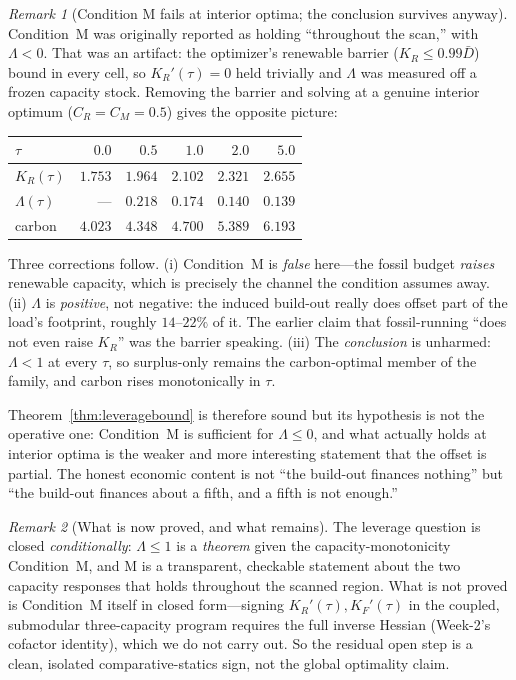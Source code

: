 \documentclass[11pt,reqno]{amsart}
\theoremstyle{plain}
\theoremstyle{definition}
\theoremstyle{remark}
\newtheorem{remark}{Remark}
\theoremstyle{remark}\newtheorem{observation}{Observation}
\newcommand{\KR}{K_R}\newcommand{\KF}{K_F}\newcommand{\KM}{K_M}
\newcommand{\Dbar}{\bar D}\newcommand{\CM}{C_M}\newcommand{\CF}{C_F}\newcommand{\CR}{C_R}
\begin{document}
\begin{remark}[Condition M fails at interior optima; the conclusion survives anyway]
\label{rem:condMfails}
Condition~M was originally reported as holding ``throughout the scan,'' with $\Lambda<0$.
That was an artifact: the optimizer's renewable barrier ($\KR\le0.99\Dbar$) bound in every
cell, so $\KR'(\tau)=0$ held trivially and $\Lambda$ was measured off a frozen capacity
stock. Removing the barrier and solving at a genuine interior optimum ($\CR=\CM=0.5$)
gives the opposite picture:
\begin{center}\small
\begin{tabular}{lrrrrr}
\toprule
$\tau$ & $0.0$ & $0.5$ & $1.0$ & $2.0$ & $5.0$\\
\midrule
$\KR(\tau)$ & $1.753$ & $1.964$ & $2.102$ & $2.321$ & $2.655$\\
$\Lambda(\tau)$ & --- & $0.218$ & $0.174$ & $0.140$ & $0.139$\\
carbon & $4.023$ & $4.348$ & $4.700$ & $5.389$ & $6.193$\\
\bottomrule
\end{tabular}
\end{center}
Three corrections follow. \textup{(i)} Condition~M is \emph{false} here---the fossil budget
\emph{raises} renewable capacity, which is precisely the channel the condition assumes away.
\textup{(ii)} $\Lambda$ is \emph{positive}, not negative: the induced build-out really does
offset part of the load's footprint, roughly $14$--$22\%$ of it. The earlier claim that
fossil-running ``does not even raise $\KR$'' was the barrier speaking.
\textup{(iii)} The \emph{conclusion} is unharmed: $\Lambda<1$ at every $\tau$, so
surplus-only remains the carbon-optimal member of the family, and carbon rises monotonically
in $\tau$.

Theorem~\ref{thm:leveragebound} is therefore sound but its hypothesis is not the operative
one: Condition~M is sufficient for $\Lambda\le0$, and what actually holds at interior optima
is the weaker and more interesting statement that the offset is partial. The honest economic
content is not ``the build-out finances nothing'' but ``the build-out finances about a fifth,
and a fifth is not enough.''
\end{remark}

\begin{remark}[What is now proved, and what remains]
The leverage question is closed \emph{conditionally}: $\Lambda\le1$ is a
\emph{theorem} given the capacity-monotonicity Condition~M, and M is a transparent,
checkable statement about the two capacity responses that holds throughout the scanned
region. What is not proved is Condition~M itself in closed form---signing
$\KR'(\tau),\KF'(\tau)$ in the coupled, submodular three-capacity program requires the full
inverse Hessian (Week-2's cofactor identity), which we do not carry out. So the residual
open step is a clean, isolated comparative-statics sign, not the global optimality claim.
\end{remark}
\end{document}

